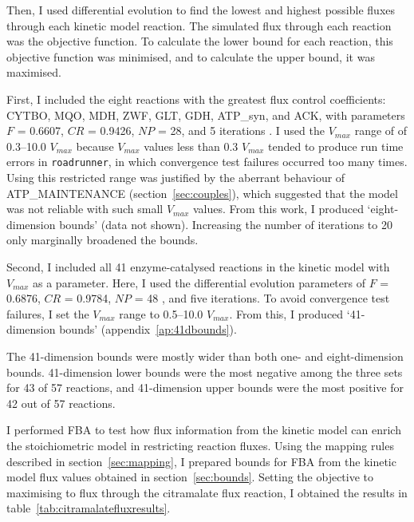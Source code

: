\documentclass[a4paper, 12pt]{scrartcl}
\begin{document}
{Then, I used differential evolution to find the lowest and highest possible fluxes through each kinetic model reaction. The simulated flux through each reaction was the objective function. To calculate the lower bound for each reaction, this objective function was minimised, and to calculate the upper bound, it was maximised.

First, I included the eight reactions with the greatest flux control coefficients: CYTBO, MQO, MDH, ZWF, GLT, GDH, ATP\_syn, and ACK, with parameters $F$ = 0.6607, $CR$ = 0.9426, $NP$ = 28, and 5 iterations \citep{pedersen_good_2010}. I used the $V_{max}$ range of of 0.3--10.0 $V_{max}$ because $V_{max}$ values less than 0.3 $V_{max}$ tended to produce run time errors in \texttt{roadrunner}, in which convergence test failures occurred too many times. Using this restricted range was justified by the aberrant behaviour of ATP\_MAINTENANCE (section~\ref{sec:couples}), which suggested that the model was not reliable with such small $V_{max}$ values. From this work, I produced `eight-dimension bounds' (data not shown). Increasing the number of iterations to 20 only marginally broadened the bounds.

Second, I included all 41 enzyme-catalysed reactions in the kinetic model with $V_{max}$ as a parameter. Here, I used the differential evolution parameters of $F$ = 0.6876, $CR$ = 0.9784, $NP$ = 48 \citep{pedersen_good_2010}, and five iterations. To avoid convergence test failures, I set the $V_{max}$ range to 0.5--10.0 $V_{max}$. From this, I produced `41-dimension bounds' (appendix~\ref{ap:41dbounds}).

The 41-dimension bounds were mostly wider than both one- and eight-dimension bounds. 41-dimension lower bounds were the most negative among the three sets for 43 of 57 reactions, and 41-dimension upper bounds were the most positive for 42 out of 57 reactions.

I performed FBA to test how flux information from the kinetic model can enrich the stoichiometric model in restricting reaction fluxes.
Using the mapping rules described in section~\ref{sec:mapping}, I prepared bounds for FBA from the kinetic model flux values obtained in section~\ref{sec:bounds}. Setting the objective to maximising to flux through the citramalate flux reaction, I obtained the results in table~\ref{tab:citramalatefluxresults}.

}
\end{document}
